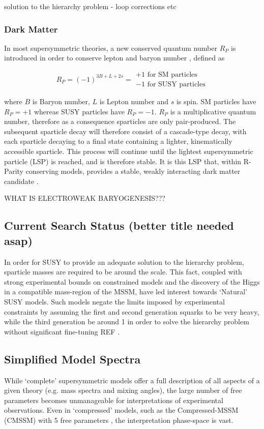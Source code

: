 solution to the hierarchy problem - loop corrections etc

\subsubsection{Dark Matter}
In most supersymmetric theories, a new conserved quantum number $R_P$
is introduced in order to conserve lepton and baryon number
\cite{Farrar1978575}, defined as

\begin{equation}
R_P = (-1)^{3B+L+2s} =
\begin{array}{l} 
+1 \text{ for SM particles}\\ -1 \text{ for SUSY particles}
\end{array}
\end{equation}

where $B$ is Baryon number, $L$ is Lepton number and $s$ is spin. SM particles
have $R_P = +1$ whereas SUSY particles have $R_P = -1$. $R_P$ is a
multiplicative quantum number, therefore as a consequence sparticles
are only pair-produced. The subsequent sparticle decay will therefore consist
of a cascade-type decay, with each sparticle decaying to a final state
containing a lighter, kinematically accessible sparticle. This process will
continue until the lightest supersymmetric particle (LSP) is reached, and is
therefore stable. It is this LSP that, within R-Parity conserving models,
provides a stable, weakly interacting dark matter candidate
\cite{Jungman:1995df}.

WHAT IS ELECTROWEAK BARYOGENESIS???

\subsection{Current Search Status (better title needed asap)}
In order for SUSY to provide an adequate solution to the hierarchy problem,
sparticle masses are required to be around the \tev scale. This fact, coupled
with strong experimental bounds on constrained models and the discovery of
the Higgs in a compatible mass-region of the MSSM, have led interest
towards `Natural' SUSY models. Such models negate the limits imposed by
experimental constraints by assuming the first and second generation squarks to
be very heavy, while the third generation be around 1 \tev in order to solve
the hierarchy problem without significant fine-tuning REF \cite{Carena:2008rt}.

\subsection{Simplified Model Spectra}
While `complete' supersymmetric models offer a full description of all
aspects of a given theory (e.g. mass spectra and mixing angles), the large
number of free parameters becomes unmanageable for interpretations
of experimental observations. Even in `compressed' models, such as the
Compressed-MSSM (CMSSM) with 5
free parameters \cite{Kane:1993td}, the interpretation phase-space is vast.

